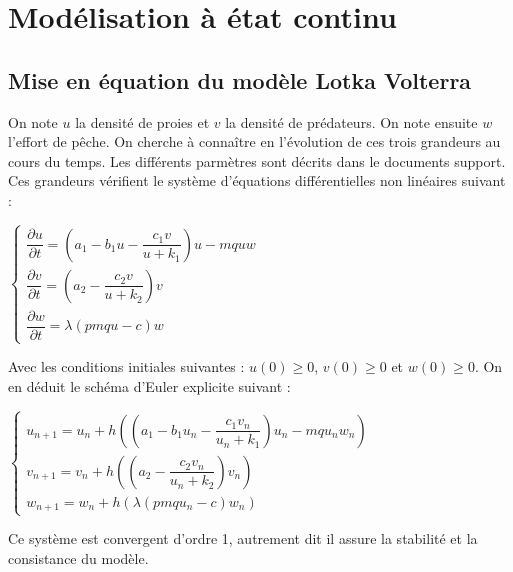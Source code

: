 \documentclass[a4paper, 11pt]{report}%
\begin{document}
    \section{Modélisation à état continu}
        \subsection{Mise en équation du modèle Lotka Volterra}
        On note $u$ la densité de proies et $v$ la densité de prédateurs. On note ensuite $w$ l'effort de pêche. On cherche à connaître en l'évolution de ces trois grandeurs au cours du temps. Les différents parmètres sont décrits dans le documents support.\\
        Ces grandeurs vérifient le système d'équations différentielles non linéaires suivant : 
        \begin{center}
        $ \left\{
            \begin{array}{ll}
                \dfrac{\partial u}{ \partial t} = \left( a_1 - b_1 u - \dfrac{c_1 v}{u+ k_1}  \right) u - mquw \\
                \dfrac{\partial v}{ \partial t} = \left( a_2 - \dfrac{c_2 v}{u+ k_2} \right) v \\
                \dfrac{\partial w}{ \partial t} = \lambda \left( pmqu - c \right) w
            \end{array}
        \right.$
        \end{center}
        Avec les conditions initiales suivantes :  $u(0) \geq 0$, $v(0) \geq 0$ et $w(0) \geq 0$.
        On en déduit le schéma d'Euler explicite suivant : 
        \begin{center}
        $ \left\{
            \begin{array}{ll}
                u_{n+1} = u_n + h \left( \left( a_1 - b_1 u_n - \dfrac{c_1 v_n}{u_n + k_1}  \right) u_n - mqu_n w_n \right)\\
                v_{n+1} = v_n + h \left( \left( a_2 - \dfrac{c_2 v_n}{u_n + k_2} \right) v_n \right) \\
                w_{n+1} = w_n + h \left( \lambda \left( pmq u_n - c \right) w_n \right)
            \end{array}
        \right.$
        \end{center}
        Ce système est convergent d'ordre 1, autrement dit il assure la stabilité et la consistance du modèle.
\end{document}
